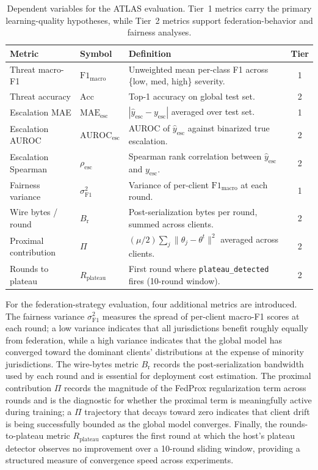 \documentclass[conference]{IEEEtran}
\begin{document}
\begin{table}[!htbp]
\centering
\caption{Dependent variables for the ATLAS evaluation. Tier~1 metrics carry the primary learning-quality hypotheses, while Tier~2 metrics support federation-behavior and fairness analyses.}
\label{tab:atlas_metrics}
\small
\setlength{\tabcolsep}{4pt}
\begin{tabularx}{\columnwidth}{l l L c}
\toprule
\textbf{Metric} & \textbf{Symbol} & \textbf{Definition} & \textbf{Tier} \\
\midrule
Threat macro-F1     & $\mathrm{F1}_{\text{macro}}$ & Unweighted mean per-class F1 across \{low, med, high\} severity. & 1 \\
Threat accuracy     & $\mathrm{Acc}$              & Top-1 accuracy on global test set. & 2 \\
Escalation MAE      & $\mathrm{MAE}_{\text{esc}}$ & $|\hat{y}_{\text{esc}} - y_{\text{esc}}|$ averaged over test set. & 1 \\
Escalation AUROC    & $\mathrm{AUROC}_{\text{esc}}$ & AUROC of $\hat{y}_{\text{esc}}$ against binarized true escalation. & 2 \\
Escalation Spearman & $\rho_{\text{esc}}$         & Spearman rank correlation between $\hat{y}_{\text{esc}}$ and $y_{\text{esc}}$. & 2 \\
Fairness variance   & $\sigma^{2}_{\text{F1}}$    & Variance of per-client $\mathrm{F1}_{\text{macro}}$ at each round. & 1 \\
Wire bytes / round  & $B_{\text{r}}$              & Post-serialization bytes per round, summed across clients. & 2 \\
Proximal contribution & $\Pi$                      & $(\mu/2)\sum_{j} \|\theta_{j} - \theta^{t}\|^{2}$ averaged across clients. & 2 \\
Rounds to plateau   & $R_{\text{plateau}}$        & First round where \texttt{plateau\_detected} fires (10-round window). & 2 \\
\bottomrule
\end{tabularx}
\end{table}

For the federation-strategy evaluation, four additional metrics are introduced. The fairness variance $\sigma^{2}_{\text{F1}}$ measures the spread of per-client macro-F1 scores at each round; a low variance indicates that all jurisdictions benefit roughly equally from federation, while a high variance indicates that the global model has converged toward the dominant clients' distributions at the expense of minority jurisdictions. The wire-bytes metric $B_{\text{r}}$ records the post-serialization bandwidth used by each round and is essential for deployment cost estimation. The proximal contribution $\Pi$ records the magnitude of the FedProx regularization term across rounds and is the diagnostic for whether the proximal term is meaningfully active during training; a $\Pi$ trajectory that decays toward zero indicates that client drift is being successfully bounded as the global model converges. Finally, the rounds-to-plateau metric $R_{\text{plateau}}$ captures the first round at which the host's plateau detector observes no improvement over a 10-round sliding window, providing a structured measure of convergence speed across experiments.
\end{document}
